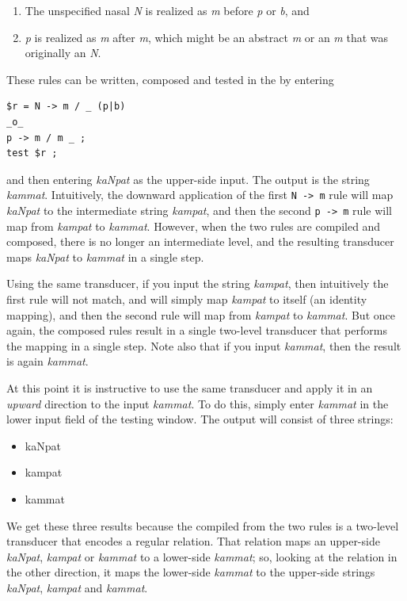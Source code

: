 \begin{enumerate}
\item
The unspecified nasal \emph{N} is realized as \emph{m} before \emph{p} or
\emph{b}, and
\item
\emph{p} is realized as \emph{m} after \emph{m}, which might be an abstract
\emph{m} or an \emph{m} that was originally an \emph{N}.
\end{enumerate}

\noindent
These rules can be written, composed and tested in the  by entering


\begin{Verbatim}
$r = N -> m / _ (p|b)
_o_
p -> m / m _ ;
test $r ;
\end{Verbatim}

\noindent
and then entering \emph{kaNpat} as the upper-side input.  The output is the string
\emph{kammat}.  Intuitively, the downward application of the first \texttt{N ->
m} rule will map \emph{kaNpat} to the intermediate string \emph{kampat}, and then
the second \texttt{p -> m} rule will map from \emph{kampat} to \emph{kammat}.
However, when the two rules are compiled and composed, there is no longer an
intermediate level, and the resulting transducer maps \emph{kaNpat} to
\emph{kammat} in a single step.

Using the same transducer, if
you input the string \emph{kampat}, then intuitively the first rule will not match, and
will simply map \emph{kampat} to itself (an identity mapping), and then the second
rule will map from \emph{kampat} to \emph{kammat}.  But once again, the composed
rules result in a single two-level transducer that performs the mapping in a
single step.  Note also that if you input \emph{kammat}, then the result is again
\emph{kammat}.

At this point it is instructive to use the same transducer and apply it in an
\emph{upward} direction to the input \emph{kammat}.  To do this, simply enter
\emph{kammat} in the lower input field of the testing window.  The output will
consist of three strings:

\begin{itemize}
\item
kaNpat
\item
kampat
\item
kammat
\end{itemize}

\noindent
We get these three results because the  compiled from the two rules is a
two-level transducer that encodes a regular relation.  That relation maps an
upper-side \emph{kaNpat}, \emph{kampat} or \emph{kammat} to a lower-side
\emph{kammat}; so, looking at the relation in the other direction, it maps the
lower-side \emph{kammat} to the upper-side strings \emph{kaNpat}, \emph{kampat}
and \emph{kammat}.

